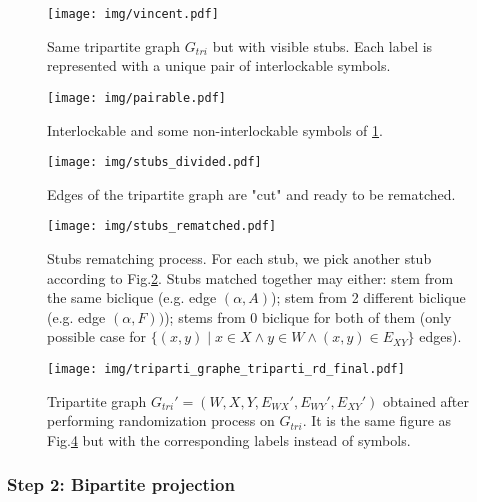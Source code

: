 \documentclass[table]{report}
\begin{document}
\begin{figure}[h]%
\centering
\texttt{[image: img/vincent.pdf]}
\caption{Same tripartite graph $G_{tri}$ but with visible stubs. Each label is represented with a unique pair of interlockable symbols.}
\label{fig:vincent}
\end{figure}
\FloatBarrier

\begin{figure}[h]%
\centering
\texttt{[image: img/pairable.pdf]}
\caption{Interlockable and some non-interlockable symbols of \ref{fig:vincent}. }
\label{fig:pairable}
\end{figure}
\FloatBarrier

\begin{figure}[h]%
\centering
\texttt{[image: img/stubs\_divided.pdf]}
\caption{Edges of the tripartite graph are "cut" and ready to be rematched.}
\label{fig:graphs}
\end{figure}
\FloatBarrier



\begin{figure}[h]%
\centering
\texttt{[image: img/stubs\_rematched.pdf]}
\caption{Stubs rematching process. For each stub, we pick another stub according to Fig.\ref{fig:pairable}. Stubs matched together may either: stem from the same biclique (e.g. edge $(\alpha,A)$); stem from 2 different biclique (e.g. edge $(\alpha,F))$); stems from 0 biclique for both of them (only possible case for $\{(x,y) \mid x \in X \wedge y \in W \wedge (x,y) \in E_{XY}\}$ edges). }
\label{fig:stubs_rematched}
\end{figure}
\FloatBarrier


\begin{figure}[h]%
\centering
\texttt{[image: img/triparti\_graphe\_triparti\_rd\_final.pdf]}
\caption{Tripartite graph ${G_{tri}}'=(W,X,Y,{E_{WX}}',{E_{WY}}',{E_{XY}}')$ obtained after performing randomization process on $G_{tri}$. It is the same figure as Fig.\ref{fig:stubs_rematched} but with the corresponding labels instead of symbols.}
\label{fig:graphs}
\end{figure}
\FloatBarrier

\subsubsection{Step 2: Bipartite projection}
\end{document}
